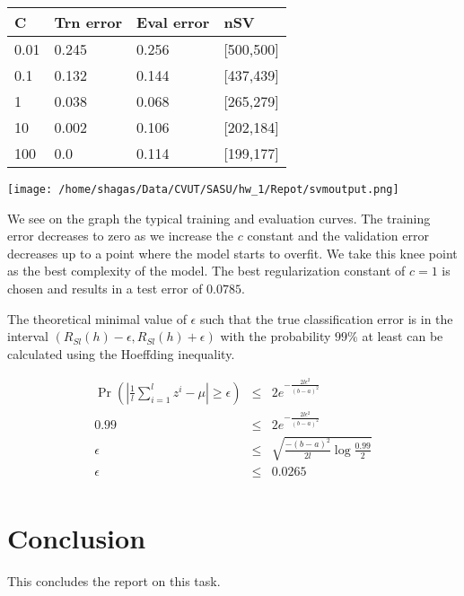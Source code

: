 \documentclass[11pt]{article}
\begin{document}
\begin{center}
\begin{tabular}{ | m{2em} | m{2cm} | m{2cm} | m{2cm} |} 
\hline
C  & Trn error & Eval error & nSV \\ 
\hline
0.01  & 0.245 & 0.256 & [500,500] \\
\hline
0.1  & 0.132 & 0.144 & [437,439] \\
\hline
1  & 0.038 & 0.068 & [265,279] \\
\hline
10  & 0.002 & 0.106 & [202,184] \\
\hline
100  & 0.0 & 0.114 & [199,177] \\


\hline
\end{tabular}
\end{center}

\begin{center}
\texttt{[image: /home/shagas/Data/CVUT/SASU/hw\_1/Repot/svmoutput.png]}
\end{center}

We see on the graph the typical training and evaluation curves. The training error decreases to zero as we increase the $c$ constant and the validation error decreases up to a point where the model starts to overfit. We take this knee point as the best complexity of the model.
The best regularization constant of $c = 1$ is chosen and results in a test error of $0.0785$.

The theoretical minimal value of $\epsilon$ such that the true classification error is in the
interval $(R_{Sl}(h) - \epsilon, R_{Sl} (h) +  \epsilon)$ with the probability $99\%$ at least can be calculated using the Hoeffding inequality. 


\begin{eqnarray}
 \Pr{(\left| \frac{1}{l} \sum\limits_{i=1}^l z^i - \mu  \right| \geq \epsilon) } &\leq& 2e^{-\frac{2l \epsilon^2}{(b-a)^2}}      \nonumber \\
 0.99 &\leq& 2e^{-\frac{2l \epsilon^2}{(b-a)^2}}      \nonumber \\
 \epsilon &\leq& \sqrt{\frac{-(b-a)^2}{2l}\log{\frac{0.99}{2}}}     \nonumber \\
  \epsilon &\leq& 0.0265    \nonumber \\
\end{eqnarray}

\section{Conclusion}
This concludes the report on this task.
\end{document}
